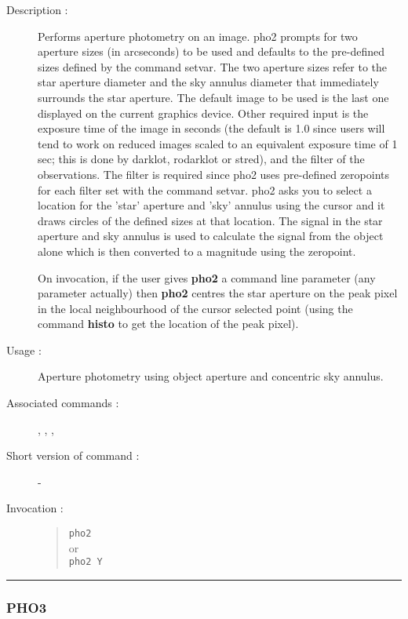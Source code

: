 \begin{description}

\item[Description :] Performs aperture photometry on an image.  pho2
prompts for two aperture sizes (in arcseconds) to be used and defaults
to the pre-defined sizes defined by the command setvar.  The two
aperture sizes refer to the star aperture diameter and the sky annulus
diameter that immediately surrounds the star aperture. The default
image to be used is the last one displayed on the current graphics
device.  Other required input is the exposure time of the image in
seconds (the default is 1.0 since users will tend to work on reduced
images scaled to an equivalent exposure time of 1 sec; this is done by
darklot, rodarklot or stred), and the filter of the observations.  The
filter is required since pho2 uses pre-defined zeropoints for each
filter set with the command setvar. pho2 asks you to select a location
for the 'star' aperture and 'sky' annulus using the cursor and it draws
circles of the defined sizes at that location. The signal in the star
aperture and sky annulus is used to calculate the signal from the
object alone which is then converted to a magnitude using
the zeropoint.

On invocation, if the user gives {\bf pho2} a command line parameter
(any parameter actually) then {\bf pho2} centres the star aperture on
the peak pixel in the local neighbourhood of the cursor selected point
(using the command {\bf histo} to get the location of the peak pixel).

\item [Usage :] Aperture photometry using object aperture and concentric sky
annulus.
\item [Associated commands :] {\tt {}},
{\tt {}}, {\tt {}},
{\tt {}}
\item [Short version of command :] -

\item[Invocation :]

\begin{quote}{\tt  pho2 }\\
or \\
{\tt pho2 Y }
\end{quote}

\end{description}

\hrule
\subsubsection*{\label{PHO3}PHO3}

